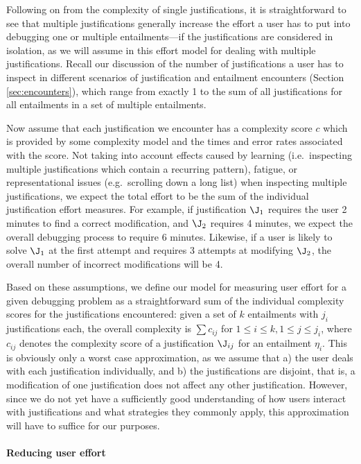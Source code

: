 Following on from the complexity of single justifications, it is straightforward to see that multiple justifications generally increase the effort a user has to put into debugging one or multiple entailments---if the justifications are considered in isolation, as we will assume in this effort model for dealing with multiple justifications. Recall our discussion of the number of justifications a user has to inspect in different scenarios of justification and entailment encounters (Section \ref{sec:encounters}), which range from exactly 1 to the sum of all justifications for all entailments in a set of multiple entailments.

Now assume that each justification we encounter has a complexity score $c$ which is provided by some complexity model and the times and error rates associated with the score. Not taking into account effects caused by learning (i.e.\ inspecting multiple justifications which contain a recurring pattern), fatigue, or representational issues (e.g.\ scrolling down a long list) when inspecting multiple justifications, we expect the total effort to be the sum of the individual justification effort measures. For example, if justification $\J_{1}$ requires the user 2 minutes to find a correct modification, and $\J_{2}$ requires 4 minutes, we expect the overall debugging process to require 6 minutes. Likewise, if a user is likely to solve $\J_{1}$ at the first attempt and requires 3 attempts at modifying $\J_{2}$, the overall number of incorrect modifications will be 4. 

Based on these assumptions, we define our model for measuring user effort for a given debugging problem as a straightforward sum of the individual complexity scores for the justifications encountered: given a set of $k$ entailments with $j_{i}$ justifications each, the overall complexity is $\sum c_{ij}$ for $1\leq i\leq k, 1\leq j\leq j_{i}$, where $c_{ij}$ denotes the complexity score of a justification $\J_{ij}$ for an entailment $\eta_{i}$. This is obviously only a worst case approximation, as we assume that a) the user deals with each justification individually, and b) the justifications are disjoint, that is, a modification of one justification does not affect any other justification. However, since we do not yet have a sufficiently good understanding of how users interact with justifications and what strategies they commonly apply, this approximation will have to suffice for our purposes.
	
\paragraph{Reducing user effort}

